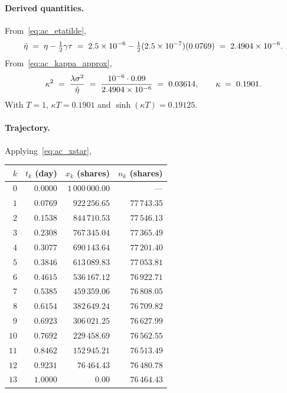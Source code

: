 \paragraph{Derived quantities.} From~\eqref{eq:ac_etatilde},
\begin{equation*}
  \tilde\eta \;=\; \eta - \tfrac{1}{2}\gamma\tau
              \;=\; 2.5\times 10^{-6} - \tfrac{1}{2}(2.5\times 10^{-7})(0.0769)
              \;=\; 2.4904\times 10^{-6}.
\end{equation*}
From~\eqref{eq:ac_kappa_approx},
\begin{equation*}
  \kappa^2 \;=\; \frac{\lambda\sigma^2}{\tilde\eta}
           \;=\; \frac{10^{-6}\cdot 0.09}{2.4904\times 10^{-6}}
           \;=\; 0.03614,
  \qquad
  \kappa \;=\; 0.1901.
\end{equation*}
With $T = 1$, $\kappa T = 0.1901$ and $\sinh(\kappa T) = 0.19125$.

\paragraph{Trajectory.} Applying~\eqref{eq:ac_xstar},

\begin{center}
\begin{tabular}{rrrr}\toprule
  $k$ & $t_k$ (day) & $x_k$ (shares) & $n_k$ (shares) \\ \midrule
  $0$ & $0.0000$ & $1\,000\,000.00$ & --- \\
  $1$ & $0.0769$ & $922\,256.65$ & $77\,743.35$ \\
  $2$ & $0.1538$ & $844\,710.53$ & $77\,546.13$ \\
  $3$ & $0.2308$ & $767\,345.04$ & $77\,365.49$ \\
  $4$ & $0.3077$ & $690\,143.64$ & $77\,201.40$ \\
  $5$ & $0.3846$ & $613\,089.83$ & $77\,053.81$ \\
  $6$ & $0.4615$ & $536\,167.12$ & $76\,922.71$ \\
  $7$ & $0.5385$ & $459\,359.06$ & $76\,808.05$ \\
  $8$ & $0.6154$ & $382\,649.24$ & $76\,709.82$ \\
  $9$ & $0.6923$ & $306\,021.25$ & $76\,627.99$ \\
  $10$ & $0.7692$ & $229\,458.69$ & $76\,562.55$ \\
  $11$ & $0.8462$ & $152\,945.21$ & $76\,513.49$ \\
  $12$ & $0.9231$ & $76\,464.43$ & $76\,480.78$ \\
  $13$ & $1.0000$ & $0.00$ & $76\,464.43$ \\ \bottomrule
\end{tabular}
\end{center}

